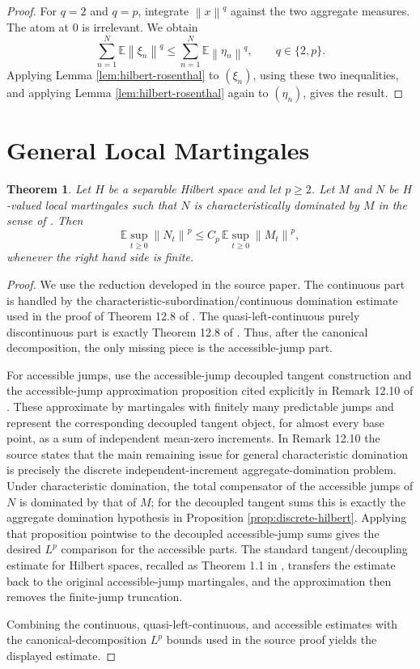 \documentclass[11pt]{article}
\newtheorem{theorem}{Theorem}
\newcommand{\E}{\mathbb E}
\newcommand{\norm}[1]{\left\lVert #1\right\rVert}
\begin{document}
\begin{proof}
For \(q=2\) and \(q=p\), integrate \(\norm{x}^q\) against the two aggregate
measures.  The atom at \(0\) is irrelevant.  We obtain
\[
  \sum_{n=1}^N\E\norm{\xi_n}^q
  \leq
  \sum_{n=1}^N\E\norm{\eta_n}^q,
  \qquad q\in\{2,p\}.
\]
Applying Lemma \ref{lem:hilbert-rosenthal} to \((\xi_n)\), using these two
inequalities, and applying Lemma \ref{lem:hilbert-rosenthal} again to
\((\eta_n)\), gives the result.
\end{proof}

\section*{General Local Martingales}

\begin{theorem}
Let \(H\) be a separable Hilbert space and let \(p\geq2\).  Let \(M\) and \(N\)
be \(H\)-valued local martingales such that \(N\) is characteristically
dominated by \(M\) in the sense of \cite{Yaroslavtsev2019}.  Then
\[
  \E\sup_{t\geq0}\norm{N_t}^p
  \leq
  C_p\,\E\sup_{t\geq0}\norm{M_t}^p ,
\]
whenever the right hand side is finite.
\end{theorem}

\begin{proof}
We use the reduction developed in the source paper.  The continuous part is
handled by the characteristic-subordination/continuous domination estimate
used in the proof of Theorem 12.8 of \cite{Yaroslavtsev2019}.  The
quasi-left-continuous purely discontinuous part is exactly Theorem 12.8 of
\cite{Yaroslavtsev2019}.  Thus, after the canonical decomposition, the only
missing piece is the accessible-jump part.

For accessible jumps, use the accessible-jump decoupled tangent construction
and the accessible-jump approximation proposition cited explicitly in Remark
12.10 of \cite{Yaroslavtsev2019}.  These approximate by martingales with
finitely many predictable jumps and represent the corresponding decoupled
tangent object, for almost every base point, as a sum of independent mean-zero
increments.  In Remark 12.10 the source states that the main remaining issue
for general characteristic domination is precisely the discrete
independent-increment aggregate-domination problem.  Under characteristic
domination, the total compensator of the accessible jumps of \(N\) is dominated
by that of \(M\); for the decoupled tangent sums this is exactly the aggregate
domination hypothesis in Proposition \ref{prop:discrete-hilbert}.  Applying
that proposition pointwise to the decoupled accessible-jump sums gives the
desired \(L^p\) comparison for the accessible parts.  The standard
tangent/decoupling estimate for Hilbert spaces, recalled as Theorem 1.1 in
\cite{Yaroslavtsev2019}, transfers the estimate back to the original
accessible-jump martingales, and the approximation then removes the
finite-jump truncation.

Combining the continuous, quasi-left-continuous, and accessible estimates with
the canonical-decomposition \(L^p\) bounds used in the source proof yields the
displayed estimate.
\end{proof}
\end{document}
